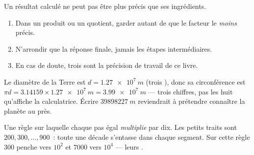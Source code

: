 \begin{method}\label{met:g10:orders-of-magnitude:sigfig}
Un résultat calculé ne peut pas être plus précis que ses ingrédients.
\begin{enumerate}
  \item Dans un produit ou un quotient, garder autant de  que le facteur le \emph{moins} précis.
  \item N'arrondir que la réponse finale, jamais les étapes
        intermédiaires.
  \item En cas de doute, trois  sont la
        précision de travail de ce livre.
\end{enumerate}
\end{method}

\begin{example}\label{ex:g10:orders-of-magnitude:sigfig}
Le diamètre de la Terre est $d = \qty{1.27e7}{m}$ (trois ), donc sa circonférence est
$\pi d = \num{3.14159} \times \qty{1.27e7}{m} = \qty{3.99e7}{m}$ ---
trois chiffres, pas les huit qu'affiche la calculatrice. Écrire
$\qty{39898227}{m}$ reviendrait à prétendre connaître la planète au
 près.
\end{example}

\begin{omfigure}

{\small Une règle sur laquelle chaque pas égal \emph{multiplie} par
dix. Les petits traits sont $200, 300, \dots, 900$~: toute une décade
s'entasse dans chaque segment. Sur cette règle $\num{300}$ penche vers
$10^{2}$ et $\num{7000}$ vers $10^{4}$ --- leurs .}
\end{omfigure}

